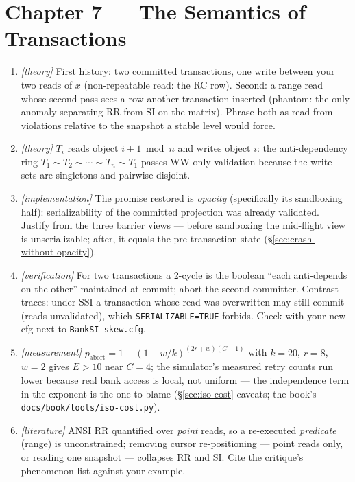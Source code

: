 \section*{Chapter 7 --- The Semantics of Transactions}

\begin{enumerate}
    \item \emph{[theory]} First history: two committed transactions, one
          write between your two reads of $x$ (non-repeatable read: the RC
          row). Second: a range read whose second pass sees a row another
          transaction inserted (phantom: the only anomaly separating RR from
          SI on the matrix). Phrase both as read-from violations relative to
          the snapshot a stable level would force.
    \item \emph{[theory]} $T_i$ reads object $i{+}1 \bmod n$ and writes
          object $i$: the anti-dependency ring $T_1 \sim T_2 \sim \cdots
          \sim T_n \sim T_1$ passes WW-only validation because the write
          sets are singletons and pairwise disjoint.
    \item \emph{[implementation]} The promise restored is \emph{opacity}
          (specifically its sandboxing half): serializability of the
          committed projection was already validated. Justify from the three
          barrier views --- before sandboxing the mid-flight view is
          unserializable; after, it equals the pre-transaction state
          (\S\ref{sec:crash-without-opacity}).
    \item \emph{[verification]} For two transactions a 2-cycle is the
          boolean ``each anti-depends on the other'' maintained at commit;
          abort the second committer. Contrast traces: under SSI a
          transaction whose read was overwritten may still commit (reads
          unvalidated), which \texttt{SERIALIZABLE=TRUE} forbids. Check with
          your new cfg next to \texttt{BankSI-skew.cfg}.
    \item \emph{[measurement]} $p_{\mathrm{abort}} = 1 -
          (1-w/k)^{(2r+w)(C-1)}$ with $k{=}20$, $r{=}8$, $w{=}2$ gives
          $E{>}10$ near $C=4$; the simulator's measured retry counts run
          lower because real bank access is local, not uniform --- the
          independence term in the exponent is the one to blame
           (\S\ref{sec:iso-cost} caveats; the book's
           \texttt{docs/book/tools/iso-cost.py}).
    \item \emph{[literature]} ANSI RR quantified over \emph{point} reads,
          so a re-executed \emph{predicate} (range) is unconstrained;
          removing cursor re-positioning --- point reads only, or reading
          one snapshot --- collapses RR and SI. Cite the critique's
          phenomenon list against your example.
\end{enumerate}

